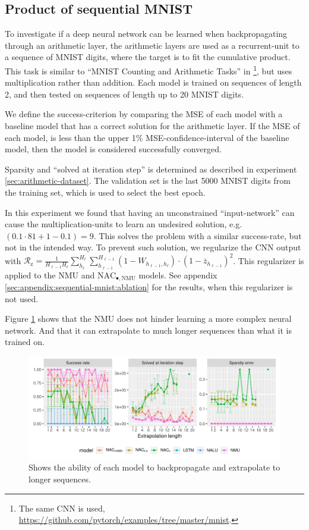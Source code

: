 \subsection{Product of sequential MNIST}

To investigate if a deep neural network can be learned when backpropagating through an arithmetic layer, the arithmetic layers are used as a recurrent-unit to a sequence of MNIST digits, where the target is to fit the cumulative product. This task is similar to ``MNIST Counting and Arithmetic Tasks'' in \citet{trask-nalu}\footnote{The same CNN is used, \url{https://github.com/pytorch/examples/tree/master/mnist}.}, but uses multiplication rather than addition. Each model is trained on sequences of length 2, and then tested on sequences of length up to 20 MNIST digits.

We define the success-criterion by comparing the MSE of each model with a baseline model that has a correct solution for the arithmetic layer. If the MSE of each model, is less than the upper 1\% MSE-confidence-interval of the baseline model, then the model is considered successfully converged.

Sparsity and ``solved at iteration step'' is determined as described in experiment \ref{sec:arithmetic-dataset}. The validation set is the last 5000 MNIST digits from the training set, which is used to select the best epoch.

In this experiment we found that having an unconstrained ``input-network'' can cause the multiplication-units to learn an undesired solution, e.g. $(0.1 \cdot 81 + 1 - 0.1) = 9$. This solves the problem with a similar success-rate, but not in the intended way. To prevent such solution, we regularize the CNN output with $\mathcal{R}_{\mathrm{z}} = \frac{1}{H_{\ell-1} H_\ell} \sum_{h_\ell}^{H_\ell} \sum_{h_{\ell-1}}^{H_{\ell-1}} (1 - W_{h_{\ell-1},h_\ell}) \cdot (1 - \bar{z}_{h_{\ell-1}})^2$. This regularizer is applied to the NMU and $\mathrm{NAC}_{\bullet,\mathrm{NMU}}$ models. See appendix \ref{sec:appendix:sequential-mnist:ablation} for the results, when this regularizer is not used.

Figure \ref{fig:sequential-mnist-prod-results} shows that the NMU does not hinder learning a more complex neural network. And that it can extrapolate to much longer sequences than what it is trained on.

\begin{figure}[h]
\centering
\includegraphics[width=\linewidth,trim={0 0.5cm 0 0},clip]{results/sequential_mnist_prod_long.pdf}
\caption{Shows the ability of each model to backpropagate and extrapolate to longer sequences.} 
\label{fig:sequential-mnist-prod-results}
\end{figure}
